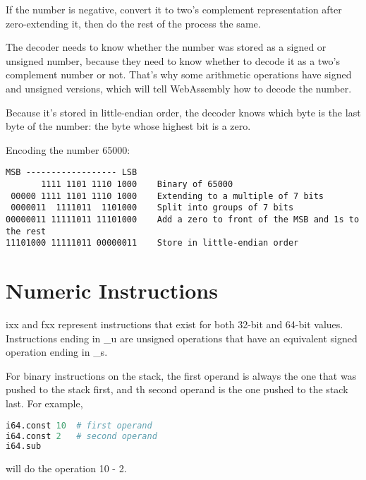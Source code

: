 \documentclass[10pt,a4paper]{article}
\begin{document}
If the number is negative, convert it to two's complement representation after zero-extending it, then do the rest of the process the same.

The decoder needs to know whether the number was stored as a signed or unsigned number, because they need to know whether to decode it as a two's complement number or not. That's why some arithmetic operations have signed and unsigned versions, which will tell WebAssembly how to decode the number.

Because it's stored in little-endian order, the decoder knows which byte is the last byte of the number: the byte whose highest bit is a zero.

Encoding the number 65000:

\begin{lstlisting}[style=code]
MSB ------------------ LSB
       1111 1101 1110 1000    Binary of 65000
 00000 1111 1101 1110 1000    Extending to a multiple of 7 bits
 0000011  1111011  1101000    Split into groups of 7 bits
00000011 11111011 11101000    Add a zero to front of the MSB and 1s to the rest
11101000 11111011 00000011    Store in little-endian order
\end{lstlisting}


\section*{Numeric Instructions}

\textsf{ixx} and \textsf{fxx} represent instructions that exist for both 32-bit and 64-bit values. Instructions ending in \textsf{\_u} are unsigned operations that have an equivalent signed operation ending in \textsf{\_s}.

For binary instructions on the stack, the first operand is always the one that was pushed to the stack first, and th second operand is the one pushed to the stack last. For example,
\begin{lstlisting}[style=code, language=python]
i64.const 10  # first operand
i64.const 2   # second operand
i64.sub
\end{lstlisting}
will do the operation 10 - 2.
\end{document}
